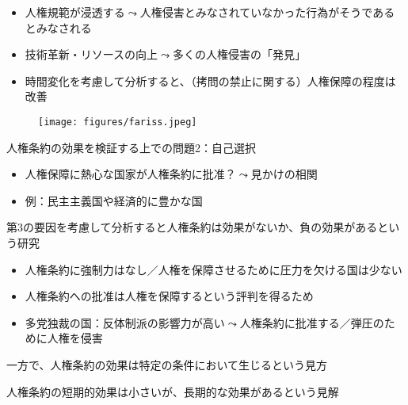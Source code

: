 \documentclass[
  xelatex,
  ja=standard]{bxjsarticle}
\providecommand{\tightlist}{%
  \setlength{\itemsep}{0pt}\setlength{\parskip}{0pt}}\usepackage{longtable,booktabs,array}
\begin{document}
\begin{itemize}
\tightlist
\item
  人権規範が浸透する\(\leadsto\)人権侵害とみなされていなかった行為がそうであるとみなされる
\item
  技術革新・リソースの向上\(\leadsto\)多くの人権侵害の「発見」
\item
  時間変化を考慮して分析すると、（拷問の禁止に関する）人権保障の程度は改善\citep{fariss2014}
\end{itemize}

\begin{figure}[htpb]

{\centering \texttt{[image: figures/fariss.jpeg]}

}

\caption{\citet{fariss2014}}

\end{figure}

人権条約の効果を検証する上での問題2：自己選択

\begin{itemize}
\tightlist
\item
  人権保障に熱心な国家が人権条約に批准？\(\leadsto\)見かけの相関
\item
  例：民主主義国や経済的に豊かな国
\end{itemize}

第3の要因を考慮して分析すると人権条約は効果がないか、負の効果があるという研究\citep{keith1999, hathaway2001, hill2010}

\begin{itemize}
\tightlist
\item
  人権条約に強制力はなし／人権を保障させるために圧力を欠ける国は少ない
\item
  人権条約への批准は人権を保障するという評判を得るため
\item
  多党独裁の国：反体制派の影響力が高い\(\leadsto\)人権条約に批准する／弾圧のために人権を侵害
\end{itemize}

一方で、人権条約の効果は特定の条件において生じるという見方\citep{neumayer2005, murdie2012, conrad2013, lupu2013}

人権条約の短期的効果は小さいが、長期的な効果があるという見解\citep{hafner2007}
\end{document}
